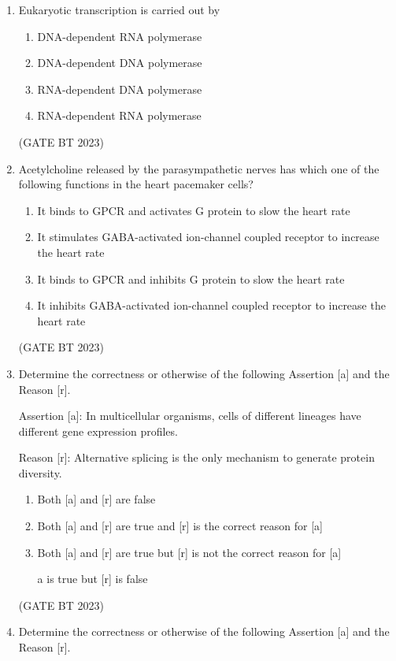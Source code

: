 \documentclass[journal,12pt,onecolumn]{IEEEtran}
\begin{document}
\begin{enumerate}
    \item Eukaryotic transcription is carried out by
    \begin{enumerate}
        \item DNA-dependent RNA polymerase
        \item DNA-dependent DNA polymerase
        \item RNA-dependent DNA polymerase
        \item RNA-dependent RNA polymerase
    \end{enumerate}
    \hfill(GATE BT 2023)

    \item Acetylcholine released by the parasympathetic nerves has which one of the following functions in the heart pacemaker cells?
    \begin{enumerate}
        \item It binds to GPCR and activates G protein to slow the heart rate
        \item It stimulates GABA-activated ion-channel coupled receptor to increase the heart rate
        \item It binds to GPCR and inhibits G protein to slow the heart rate
        \item It inhibits GABA-activated ion-channel coupled receptor to increase the heart rate
    \end{enumerate}
    \hfill(GATE BT 2023)

    \item Determine the correctness or otherwise of the following Assertion [a] and the Reason [r].
    
    Assertion [a]: In multicellular organisms, cells of different lineages have different gene expression profiles.
    
    Reason [r]: Alternative splicing is the only mechanism to generate protein diversity.
    \begin{enumerate}
        \item Both [a] and [r] are false
        \item Both [a] and [r] are true and [r] is the correct reason for [a]
        \item Both [a] and [r] are true but [r] is not the correct reason for [a]
        \item [a] is true but [r] is false
    \end{enumerate}
    \hfill(GATE BT 2023)

    \item Determine the correctness or otherwise of the following Assertion [a] and the Reason [r].
    

\end{enumerate}
\end{document}
